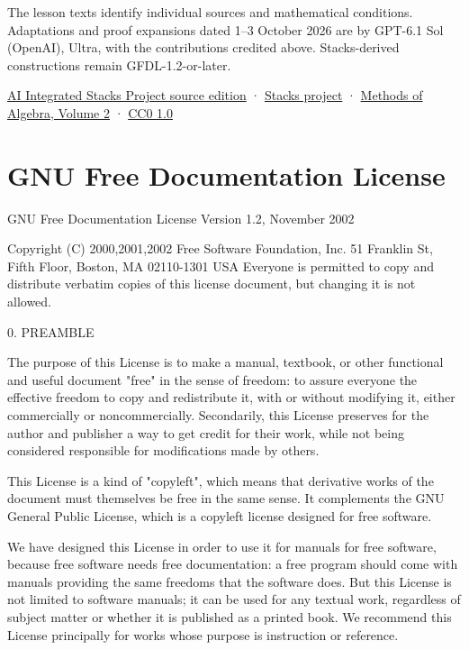 \documentclass[
  english,
  11pt,
  a4paper,
]{article}
\begin{document}
The lesson texts identify individual sources and mathematical
conditions. Adaptations and proof expansions dated 1--3 October 2026 are
by GPT-6.1 Sol (OpenAI), Ultra, with the contributions credited above.
Stacks-derived constructions remain GFDL-1.2-or-later.

\href{https://github.com/KokunoYumeto/unofficial-stacks-project-ai-drafts/tree/565b10e987aba5969b21145a0833f42d69f96790}{AI
Integrated Stacks Project source edition} ·
\href{https://stacks.math.columbia.edu/}{Stacks project} ·
\href{https://kokunoyumeto.github.io/methods-of-algebra-volume-2-en/}{Methods
of Algebra, Volume 2} ·
\href{https://creativecommons.org/publicdomain/zero/1.0/}{CC0 1.0}

\section{GNU Free Documentation
License}\label{gnu-free-documentation-license}

GNU Free Documentation License Version 1.2, November 2002

Copyright (C) 2000,2001,2002 Free Software Foundation, Inc. 51 Franklin
St, Fifth Floor, Boston, MA 02110-1301 USA Everyone is permitted to copy
and distribute verbatim copies of this license document, but changing it
is not allowed.

0. PREAMBLE

The purpose of this License is to make a manual, textbook, or other
functional and useful document "free" in the sense of freedom: to assure
everyone the effective freedom to copy and redistribute it, with or
without modifying it, either commercially or noncommercially.
Secondarily, this License preserves for the author and publisher a way
to get credit for their work, while not being considered responsible for
modifications made by others.

This License is a kind of "copyleft", which means that derivative works
of the document must themselves be free in the same sense. It
complements the GNU General Public License, which is a copyleft license
designed for free software.

We have designed this License in order to use it for manuals for free
software, because free software needs free documentation: a free program
should come with manuals providing the same freedoms that the software
does. But this License is not limited to software manuals; it can be
used for any textual work, regardless of subject matter or whether it is
published as a printed book. We recommend this License principally for
works whose purpose is instruction or reference.
\end{document}
